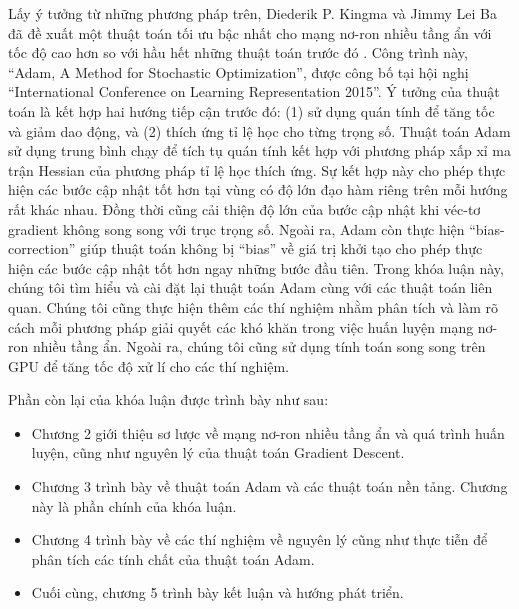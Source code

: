 Lấy ý tưởng từ những phương pháp trên, Diederik P. Kingma và Jimmy Lei Ba đã đề xuất một thuật toán tối ưu bậc nhất cho mạng nơ-ron nhiều tầng ẩn với tốc độ cao hơn so với hầu hết những thuật toán trước đó \cite{kingma2014adam}. Công trình này, ``Adam, A Method for Stochastic Optimization'', được công bố tại hội nghị ``International Conference on Learning Representation 2015''. Ý tưởng của thuật toán là kết hợp hai hướng tiếp cận trước đó: (1) sử dụng quán tính để tăng tốc và giảm dao động, và (2) thích ứng tỉ lệ học cho từng trọng số. Thuật toán Adam sử dụng trung bình chạy để tích tụ quán tính kết hợp với phương pháp xấp xỉ ma trận Hessian của phương pháp tỉ lệ học thích ứng. Sự kết hợp này cho phép thực hiện các bước cập nhật tốt hơn tại vùng có độ lớn đạo hàm riêng trên mỗi hướng rất khác nhau. Đồng thời cũng cải thiện độ lớn của bước cập nhật khi véc-tơ gradient không song song với trục trọng số. Ngoài ra, Adam còn thực hiện ``bias-correction'' giúp thuật toán không bị ``bias'' về giá trị khởi tạo cho phép thực hiện các bước cập nhật tốt hơn ngay những bước đầu tiên. Trong khóa luận này, chúng tôi tìm hiểu và cài đặt lại thuật toán Adam cùng với các thuật toán liên quan. Chúng tôi cũng thực hiện thêm các thí nghiệm nhằm phân tích và làm rõ cách mỗi phương pháp giải quyết các khó khăn trong việc huấn luyện mạng nơ-ron nhiều tầng ẩn. Ngoài ra, chúng tôi cũng sử dụng tính toán song song trên GPU để tăng tốc độ xử lí cho các thí nghiệm.

Phần còn lại của khóa luận được trình bày như sau:

\begin{itemize}
	\item Chương 2 giới thiệu sơ lược về mạng nơ-ron nhiều tầng ẩn và quá trình huấn luyện, cũng như nguyên lý của thuật toán Gradient Descent.
	\item Chương 3 trình bày về thuật toán Adam và các thuật toán nền tảng. Chương này là phần chính của khóa luận.
	\item Chương 4 trình bày về các thí nghiệm về nguyên lý cũng như thực tiễn để phân tích các tính chất của thuật toán Adam.
	\item Cuối cùng, chương 5 trình bày kết luận và hướng phát triển.
\end{itemize}
